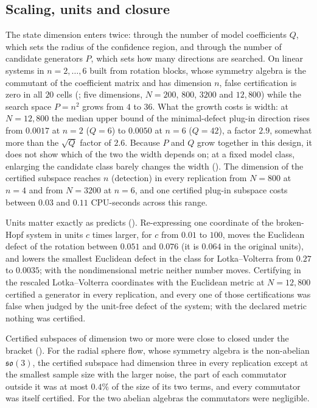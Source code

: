 \subsection{Scaling, units and closure}
\label{sec:scaling}

The state dimension enters twice: through the number of model coefficients $Q$,
which sets the radius of the confidence region, and through the number of
candidate generators $P$, which sets how many directions are searched. On
linear systems in $n = 2,\dots,6$ built from rotation blocks, whose symmetry
algebra is the commutant of the coefficient matrix and has dimension $n$, false
certification is zero in all $20$ cells (\STscaling; five dimensions, $N = 200$, $800$,
$3200$ and $12{,}800$) while the search space $P = n^2$ grows from $4$ to $36$.
What the growth costs is width: at $N = 12{,}800$ the median upper bound of the
minimal-defect plug-in direction rises from $0.0017$ at $n=2$ ($Q=6$) to
$0.0050$ at $n=6$ ($Q=42$), a factor $2.9$, somewhat more than the $\sqrt{Q}$
factor of $2.6$. Because $P$ and $Q$ grow together in this design, it does not
show which of the two the width depends on; at a fixed model class, enlarging
the candidate class barely changes the width (). The
dimension of the certified subspace reaches $n$ (detection) in every
replication from $N = 800$ at $n = 4$ and from $N = 3200$ at $n = 6$, and one
certified plug-in subspace costs between $0.03$ and $0.11$ CPU-seconds across
this range.

Units matter exactly as  predicts (\STunits). Re-expressing one
coordinate of the broken-Hopf system in units $c$ times larger, for $c$ from
$0.01$ to $100$, moves the Euclidean defect of the rotation between $0.051$ and
$0.076$ (it is $0.064$ in the original units), and lowers the smallest
Euclidean defect in the class for Lotka--Volterra from $0.27$ to $0.0035$; with
the nondimensional metric neither number moves. Certifying in the rescaled
Lotka--Volterra coordinates with the Euclidean metric at $N = 12{,}800$
certified a generator in every replication, and every one of those
certifications was false when judged by the unit-free defect of the system;
with the declared metric nothing was certified.

Certified subspaces of dimension two or more were close to closed under the
bracket (\STclosure). For the radial sphere flow, whose symmetry algebra is the
non-abelian $\mathfrak{so}(3)$, the certified subspace had dimension three in
every replication except at the smallest sample size with the larger noise,
the part of each commutator outside it was at most $0.4\%$ of the size of its
two terms, and every commutator was itself certified. For the two
abelian algebras the commutators were negligible.

